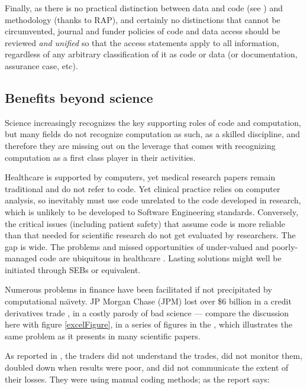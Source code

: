 \documentclass{comjnl}
\begin{document}
Finally, as there is no practical distinction between data and code (see \supplement) and methodology (thanks to RAP), and certainly no distinctions that cannot be circumvented, journal and funder policies of code and data access should be reviewed \emph{and unified\/} so that the access statements apply to all information, regardless of any arbitrary classification of it as code or data (or documentation, assurance case, etc).

\subsection{Benefits beyond science}\label{benefits-beyond-science}
Science increasingly recognizes the key supporting roles of code and computation, but many fields do not recognize computation as such, as a skilled discipline, and therefore they are missing out on the leverage that comes with recognizing computation as a first class player in their  activities. 

Healthcare is supported by computers, yet medical research papers remain traditional and do not refer to code. Yet clinical practice relies on computer analysis, so inevitably must use code unrelated to the code developed in research, which is unlikely to be developed to Software Engineering standards. Conversely, the critical issues (including patient safety) that assume code is more reliable than that needed for scientific research do not get evaluated by researchers. The gap is wide. The problems and missed opportunities of under-valued and poorly-managed code are ubiquitous in healthcare \cite{fixit}. Lasting solutions might well be initiated through SEBs or equivalent.

Numerous problems in finance have been facilitated if not precipitated by computational na\" \i vety. JP Morgan Chase (JPM) lost over \$6 billion in a credit derivatives trade \cite{jpm}, in a costly parody of bad science --- compare the discussion here with figure \ref{excelFigure}, in a series of figures in the \supplement, which illustrates the same problem as it presents in many scientific papers. 

As reported in \cite{jpm}, the traders did not understand the trades, did not monitor them, doubled down when results were poor, and did not communicate the extent of their losses. They were using manual coding methods; as the report says: 
\end{document}

